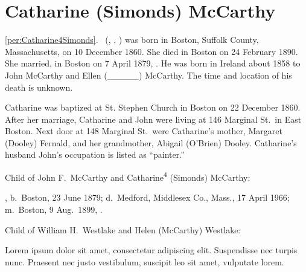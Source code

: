 \section{Catharine (Simonds) McCarthy}

\ref{per:Catharine4Simonds}.\  (, , ) was born in Boston, Suffolk County, Massachusetts, on 10 December 1860.\cite{Catharine4SimondsBirth} She died in Boston on 24 February 1890.\cite{Catharine4SimondsDeath} She married, in Boston on 7 April 1879, .\cite{JohnMcCarthyMarriage} He was born in Ireland about 1858 to John McCarthy and Ellen (\_\_\_\_\_) McCarthy.\cite{JohnMcCarthyMarriage} The time and location of his death is unknown.

Catharine was baptized at St. Stephen Church in Boston on 22 December 1860.\cite{Catharine4SimondsBaptism} After her marriage, Catharine and John were living at 146 Marginal St.\ in East Boston. Next door at 148 Marginal St.\ were Catharine's mother, Margaret (Dooley) Fernald, and her grandmother, Abigail (O'Brien) Dooley. Catharine's husband John's occupation is listed as ``painter.''\cite{Census1880Catharine4Simonds}

\begin{KidsIntro}
	Child of John F.\ McCarthy and Catharine\textsuperscript{4} (Simonds) McCarthy:
\end{KidsIntro}

\begin{Kids}
	, b.\ Boston, 23 June 1879;\cite{Helen5McCarthyBirth} d.\ Medford, Middlesex Co., Mass., 17 April 1966;\cite{Helen5McCarthyDeath} m.\ Boston, 9 Aug.\ 1899, .\cite{Helen5McCarthyMarriage}

\begin{GrandkidsIntro}
	Child of William H.\ Westlake and Helen (McCarthy) Westlake:
\end{GrandkidsIntro}

\begin{Grandkids}		
	  Lorem ipsum dolor sit amet, consectetur adipiscing elit. Suspendisse nec turpis nunc. Praesent nec justo vestibulum, suscipit leo sit amet, vulputate lorem.
\end{Grandkids}

\end{Kids}


